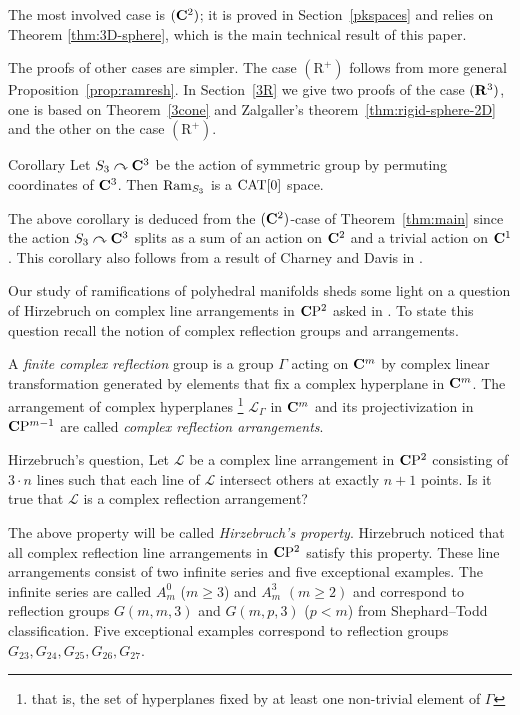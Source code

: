 \documentclass{compositio}
\begin{document}
The most involved case is $(\mathbf{C}^2)$;
it is proved in Section~\ref{pkspaces} 
and relies on Theorem \ref{thm:3D-sphere},
which is the main technical result of this paper.

The proofs of other cases are simpler.
The case $(\mathrm{R}^+)$ follows from more general Proposition~\ref{prop:ramresh}.
In Section~\ref{3R}
we give two proofs of the case $(\mathbf{R}^3)$, one is based on Theorem~\ref{3cone} and Zalgaller's theorem~\ref{thm:rigid-sphere-2D}
and the other on the case $(\mathrm{R}^+)$.

\begin{thm}{Corollary}\label{cor:braid}
Let $S_3\curvearrowright\mathbf{C}^3$ be the action of symmetric group by permuting coordinates of $\mathbf{C}^3$.
Then $\mathop{\rm Ram}\nolimits_{S_3}$ is a $\mathrm{CAT}[0]$ space.
\end{thm}

The above corollary is deduced from the $(\mathbf{C}^2)$-case of Theorem~\ref{thm:main}
since the action $S_3\curvearrowright\mathbf{C}^3$ splits as a sum of an action on $\mathbf{C}^2$ and a trivial action on $\mathbf{C}^1$.
This corollary also follows from a result of Charney and Davis in \cite{charney-davis-93}.


Our study of ramifications of polyhedral manifolds sheds  some light on a question of Hirzebruch on complex line arrangements in $\mathbf{C}\mathrm{P}^2$ asked in \cite{Hirzebruch}. To state this question recall the notion of complex reflection groups and arrangements. 

A {\it finite complex reflection} group is a group $\Gamma$ acting on $\mathbf{C}^m$ by complex linear transformation generated by elements that fix a complex hyperplane in $\mathbf{C}^m$. 
The arrangement of complex hyperplanes%
\footnote{that is, the set of hyperplanes fixed by at least one non-trivial element of $\Gamma$} 
 $\mathcal{L}_\Gamma$ in $\mathbf{C}^m$ and its projectivization in $\mathbf{C}\mathrm{P}^{m-1}$ are called {\it complex reflection arrangements}.

\begin{thm}{Hirzebruch's question, \cite{Hirzebruch}} Let  $\mathcal{L}$ be a complex line arrangement in $\mathbf{C}\mathrm{P}^2$ consisting of $3\cdot n$ lines such that each line of $\mathcal{L}$ intersect others at exactly $n+1$ points. 
Is it true that $\mathcal{L}$ is a complex reflection arrangement?
\end{thm}
The above property will be called {\it Hirzebruch's property}.
Hirzebruch noticed that all complex reflection line arrangements in $\mathbf{C}\mathrm{P}^2$ satisfy this property. These line arrangements consist of two infinite series and five exceptional examples. 
The infinite series are called $A_m^0$ ($m\ge 3$) and $A_m^3$ $(m\ge 2)$ and correspond to reflection groups $G(m,m,3)$ and $G(m,p,3)$ ($p<m$) from Shephard--Todd classification. 
Five  exceptional examples correspond to reflection groups $G_{23}, G_{24}, G_{25}, G_{26}, G_{27}$. 
\end{document}

